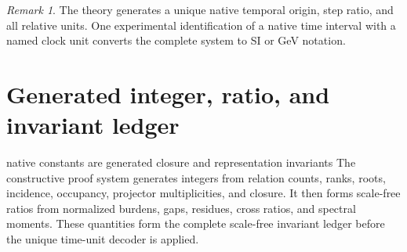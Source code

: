 \documentclass[11pt]{article}
\numberwithin{equation}{section}
\theoremstyle{remark}
\newtheorem{remark}[definition]{Remark}
\begin{document}
\begin{remark}
The theory generates a unique native temporal origin, step ratio, and all relative units. One experimental identification of a native time interval with a named clock unit converts the complete system to SI or GeV notation.
\end{remark}


\section{Generated integer, ratio, and invariant ledger}
\label{sec:invariantledger}
\begin{conceptledger}{native constants are generated closure and representation invariants}
The constructive proof system generates integers from relation counts, ranks, roots, incidence, occupancy, projector multiplicities, and closure. It then forms scale-free ratios from normalized burdens, gaps, residues, cross ratios, and spectral moments. These quantities form the complete scale-free invariant ledger before the unique time-unit decoder is applied.
\end{conceptledger}
\end{document}
